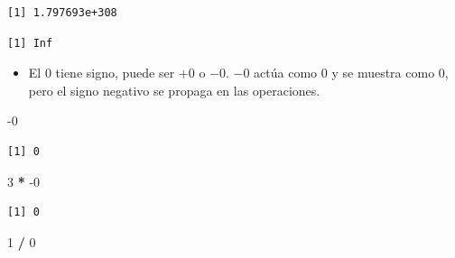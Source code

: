 \documentclass[openany]{book}
\newenvironment{Shaded}{\begin{snugshade}}{\end{snugshade}}
\newcommand{\DecValTok}[1]{\textcolor[rgb]{0.00,0.00,0.81}{#1}}
\newcommand{\NormalTok}[1]{#1}
\newcommand{\OperatorTok}[1]{\textcolor[rgb]{0.81,0.36,0.00}{\textbf{#1}}}
\newcommand{\StringTok}[1]{\textcolor[rgb]{0.31,0.60,0.02}{#1}}
\providecommand{\tightlist}{%
  \setlength{\itemsep}{0pt}\setlength{\parskip}{0pt}}
\begin{document}
\begin{Shaded}
\end{Shaded}

\begin{verbatim}
[1] 1.797693e+308
\end{verbatim}

\begin{Shaded}
\end{Shaded}

\begin{verbatim}
[1] Inf
\end{verbatim}

\begin{itemize}
\tightlist
\item
  El 0 tiene signo, puede ser \(+0\) o \(-0\). \(-0\) actúa como \(0\) y se muestra como \(0\), pero el signo negativo se propaga en las operaciones.
\end{itemize}

\begin{Shaded}
\begin{Highlighting}[]
\DecValTok{-0}
\end{Highlighting}
\end{Shaded}

\begin{verbatim}
[1] 0
\end{verbatim}

\begin{Shaded}
\begin{Highlighting}[]
\DecValTok{3} \OperatorTok{*}\StringTok{ }\DecValTok{-0}
\end{Highlighting}
\end{Shaded}

\begin{verbatim}
[1] 0
\end{verbatim}

\begin{Shaded}
\begin{Highlighting}[]
\DecValTok{1} \OperatorTok{/}\StringTok{ }\DecValTok{0}
\end{Highlighting}
\end{Shaded}
\end{document}
